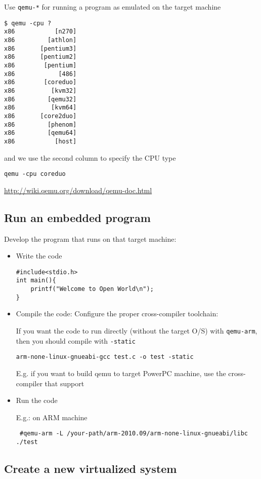 Use \verb!qemu-*! for running a program as emulated on the target machine 
\begin{verbatim}
$ qemu -cpu ?
x86           [n270]
x86         [athlon]
x86       [pentium3]
x86       [pentium2]
x86        [pentium]
x86            [486]
x86        [coreduo]
x86          [kvm32]
x86         [qemu32]
x86          [kvm64]
x86       [core2duo]
x86         [phenom]
x86         [qemu64]
x86           [host]
\end{verbatim}  
and we use the second column to specify the CPU type
\begin{verbatim}
qemu -cpu coreduo 
\end{verbatim}

\url{http://wiki.qemu.org/download/qemu-doc.html}

\subsection{Run an embedded program}

Develop the program that runs on that target machine:
\begin{itemize}
   \item Write the code
\begin{verbatim}
#include<stdio.h>
int main(){
    printf("Welcome to Open World\n");
}
\end{verbatim}
   
   \item Compile the code: Configure the proper cross-compiler toolchain:

If you want the code to run directly (without the target O/S) with
\verb!qemu-arm!, then you should compile with \verb!-static!
\begin{verbatim}
arm-none-linux-gnueabi-gcc test.c -o test -static
\end{verbatim}  

  E.g. if you want to build qemu to target PowerPC machine, use the
  cross-compiler that support
   
   \item Run the code
 
 E.g.: on ARM machine  
 \begin{verbatim}
 #qemu-arm -L /your-path/arm-2010.09/arm-none-linux-gnueabi/libc ./test 
 \end{verbatim}
\end{itemize}

\subsection{Create a new virtualized system}
\label{sec:qemu-create-OS-image}

